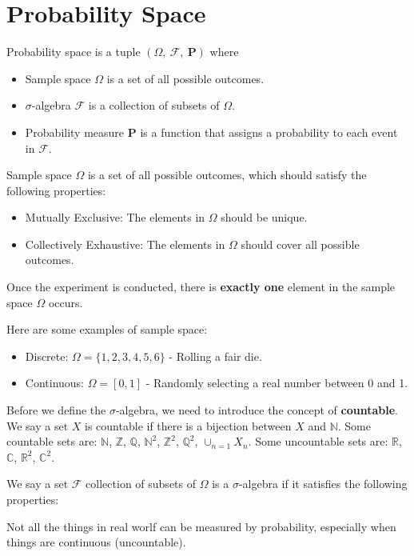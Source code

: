 \chapter{Probability Space}
\begin{definition}
    Probability space is a tuple $\left(\varOmega,~\mathcal{F},~\mathbf{P}\right)$ where
    \begin{itemize}
        \item Sample space $\varOmega$ is a set of all possible outcomes.
        \item $ \sigma $-algebra $\mathcal{F}$ is a collection of subsets of $\varOmega$.
        \item Probability measure $\mathbf{P}$ is a function that assigns a probability to each event in $\mathcal{F}$.
    \end{itemize}
\end{definition}

\begin{definition}
    Sample space $\varOmega$ is a set of all possible outcomes, which should satisfy the following properties:
    \begin{itemize}
        \item Mutually Exclusive: The elements in $\varOmega$ should be unique.
        \item Collectively Exhaustive: The elements in $\varOmega$ should cover all possible outcomes.
    \end{itemize}
\end{definition}

Once the experiment is conducted, there is \textbf{exactly one} element in the sample space $\varOmega$ occurs.

\begin{example}
    Here are some examples of sample space:
    \begin{itemize}
        \item Discrete: $\varOmega = \{1, 2, 3, 4, 5, 6\}$ - Rolling a fair die.
        \item Continuous: $\varOmega = [0, 1]$ - Randomly selecting a real number between 0 and 1.
    \end{itemize}
\end{example}

Before we define the $\sigma$-algebra, we need to introduce the concept of \textbf{countable}. We say a set $X$ is countable if there is a bijection between $X$ and $\mathbb{N}$. Some countable sets are: $\mathbb{N}$, $\mathbb{Z}$, $\mathbb{Q}$, $\mathbb{N}^2$, $\mathbb{Z}^2$, $\mathbb{Q}^2$, $\cup_{n=1}X_{n}$. Some uncountable sets are: $\mathbb{R}$, $\mathbb{C}$, $\mathbb{R}^2$, $\mathbb{C}^2$.

\begin{definition}
    We say a set $\mathcal{F}$  collection of subsets of $\varOmega$ is a $\sigma$-algebra if it satisfies the following properties:
\end{definition}

\begin{remark}
    Not all the things in real worlf can be measured by probability, especially when things are continuous (uncountable).
\end{remark}
